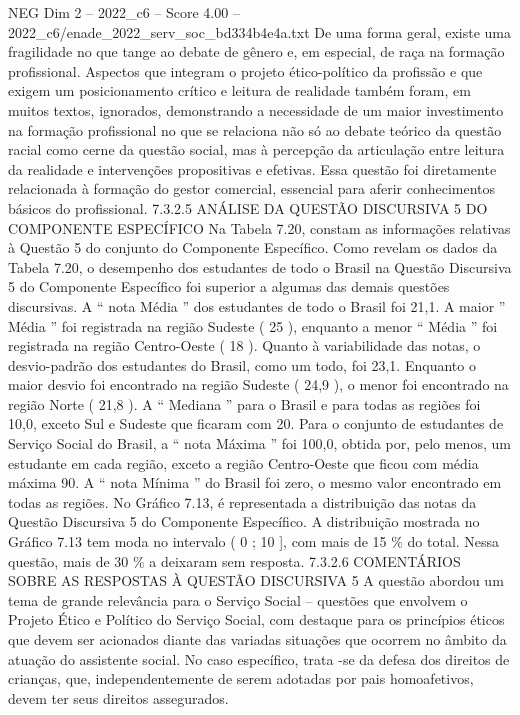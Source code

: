 \begin{textsample}{NEG Dim 2 – 2022\_c6 – Score 4.00 – 2022\_c6/enade\_2022\_serv\_soc\_bd334b4e4a.txt}
De uma forma geral, existe uma fragilidade no que tange ao debate de gênero e, em especial, de raça na formação profissional.
Aspectos que integram o projeto ético-político da profissão e que exigem um posicionamento crítico e leitura de realidade também foram, em muitos textos, ignorados, demonstrando a necessidade de um maior investimento na formação profissional no que se relaciona não só ao debate teórico da questão racial como cerne da questão social, mas à percepção da articulação entre leitura da realidade e intervenções propositivas e efetivas.
Essa questão foi diretamente relacionada à formação do gestor comercial, essencial para aferir conhecimentos básicos do profissional. 7.3.2.5 ANÁLISE DA QUESTÃO DISCURSIVA 5 DO COMPONENTE ESPECÍFICO Na Tabela 7.20, constam as informações relativas à Questão 5 do conjunto do Componente Específico.
Como revelam os dados da Tabela 7.20, o desempenho dos estudantes de todo o Brasil na Questão Discursiva 5 do Componente Específico foi superior a algumas das demais questões discursivas.
A “ nota Média ” dos estudantes de todo o Brasil foi 21,1.
A maior ” Média ” foi registrada na região Sudeste ( 25 ), enquanto a menor “ Média ” foi registrada na região Centro-Oeste ( 18 ).
Quanto à variabilidade das notas, o desvio-padrão dos estudantes do Brasil, como um todo, foi 23,1.
Enquanto o maior desvio foi encontrado na região Sudeste ( 24,9 ), o menor foi encontrado na região Norte ( 21,8 ).
A “ Mediana ” para o Brasil e para todas as regiões foi 10,0, exceto Sul e Sudeste que ficaram com 20.
Para o conjunto de estudantes de Serviço Social do Brasil, a “ nota Máxima ” foi 100,0, obtida por, pelo menos, um estudante em cada região, exceto a região Centro-Oeste que ficou com média máxima 90.
A “ nota Mínima ” do Brasil foi zero, o mesmo valor encontrado em todas as regiões.
No Gráfico 7.13, é representada a distribuição das notas da Questão Discursiva 5 do Componente Específico.
A distribuição mostrada no Gráfico 7.13 tem moda no intervalo ( 0 ; 10 ], com mais de 15 \% do total.
Nessa questão, mais de 30 \% a deixaram sem resposta. 7.3.2.6 COMENTÁRIOS SOBRE AS RESPOSTAS À QUESTÃO DISCURSIVA 5 A questão abordou um tema de grande relevância para o Serviço Social – questões que envolvem o Projeto Ético e Político do Serviço Social, com destaque para os princípios éticos que devem ser acionados diante das variadas situações que ocorrem no âmbito da atuação do assistente social.
No caso específico, trata -se da defesa dos direitos de crianças, que, independentemente de serem adotadas por pais homoafetivos, devem ter seus direitos assegurados.

\end{textsample}
